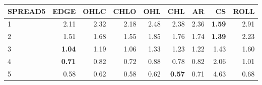 \begin{table}[ht]
\centering
\begin{tabular}{lrrrrrrrr}
  \hline
SPREAD5 & EDGE & OHLC & CHLO & OHL & CHL & AR & CS & ROLL \\ 
  \hline
1 & 2.11 & 2.32 & 2.18 & 2.48 & 2.38 & 2.36 & \textbf{1.59} & 2.91 \\ 
  2 & 1.51 & 1.68 & 1.55 & 1.85 & 1.76 & 1.74 & \textbf{1.39} & 2.23 \\ 
  3 & \textbf{1.04} & 1.19 & 1.06 & 1.33 & 1.23 & 1.22 & 1.43 & 1.60 \\ 
  4 & \textbf{0.71} & 0.82 & 0.72 & 0.88 & 0.78 & 0.82 & 2.06 & 1.01 \\ 
  5 & 0.58 & 0.62 & 0.58 & 0.62 & \textbf{0.57} & 0.71 & 4.63 & 0.68 \\ 
   \hline
\end{tabular}
\end{table}
